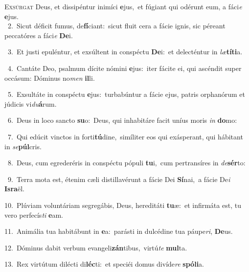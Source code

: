 \lettrine{\initial\textcolor{\initialcolor}{E}}{xsúrgat} Deus, et dissipéntur inimíci \textbf{e}\-jus,~\star et fúgiant qui odérunt eum, a fáci\textit{e} \textbf{e}\-jus.\\
{\numbfont\textcolor{\numbcolor}{~2.}}~Sicut déficit fumus, de\-\textbf{fí}\-ciant:~\star sicut fluit cera a fácie ignis, sic péreant peccatóres a fáci\textit{e} \textbf{De}\-i.\par
{\numbfont\textcolor{\numbcolor}{~3.}}~Et justi epuléntur, et exsúltent in conspéctu \textbf{De}\-i:~\star et delecténtur in \textit{læ}\-\textbf{tí}\textbf{ti}a.\par
{\numbfont\textcolor{\numbcolor}{~4.}}~Cantáte Deo, psalmum dícite nómini \textbf{e}\-jus:~\star iter fácite ei, qui ascéndit super occásum: Dóminus no\textit{men} \textbf{il}\-li.\par
{\numbfont\textcolor{\numbcolor}{~5.}}~Exsultáte in conspéctu \textbf{e}\-jus:~\star turbabúntur a fácie ejus, patris orphanórum et júdicis vi\-\textit{du}\-\textbf{á}rum.\par
{\numbfont\textcolor{\numbcolor}{~6.}}~Deus in loco sancto \textbf{su}\-o:~\star Deus, qui inhabitáre facit uníus moris \textit{in} \textbf{do}\-mo:\par
{\numbfont\textcolor{\numbcolor}{~7.}}~Qui edúcit vinctos in forti\-\textbf{tú}\-dine,~\star simíliter eos qui exásperant, qui hábitant in \textit{se}\-\textbf{púl}cris.\par
{\numbfont\textcolor{\numbcolor}{~8.}}~Deus, cum egrederéris in conspéctu pópuli \textbf{tu}\-i,~\star cum pertransíres in \textit{de}\-\textbf{sér}to:\par
{\numbfont\textcolor{\numbcolor}{~9.}}~Terra mota est, étenim cæli distillavérunt a fácie Dei \textbf{Sí}\-nai,~\star a fácie De\textit{i} \textbf{Is}\-\textbf{ra}ël.\par
{\numbfont\textcolor{\numbcolor}{10.}}~Plúviam voluntáriam segregábis, Deus, hereditáti \textbf{tu}\-æ:~\star et infirmáta est, tu vero perfecís\textit{ti} \textbf{e}\-am.\par
{\numbfont\textcolor{\numbcolor}{11.}}~Animália tua habitábunt in \textbf{e}\-a:~\star parásti in dulcédine tua páupe\-\textit{ri}\-, \textbf{De}\-us.\par
{\numbfont\textcolor{\numbcolor}{12.}}~Dóminus dabit verbum evangeli\-\textbf{zán}\-tibus,~\star virtú\textit{te} \textbf{mul}\-ta.\par
{\numbfont\textcolor{\numbcolor}{13.}}~Rex virtútum dilécti di\-\textbf{léc}\-ti:~\star et speciéi domus divíde\textit{re} \textbf{spó}\-\textbf{li}a.\par
